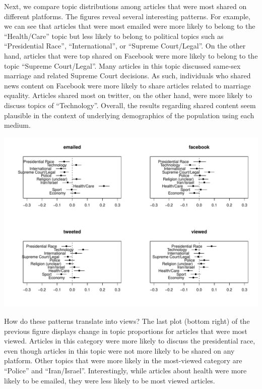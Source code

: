 \documentclass[12pt]{article}\usepackage[]{graphicx}\usepackage[]{color}
\makeatletter
\def\maxwidth{ %
  \ifdim\Gin@nat@width>\linewidth
    \linewidth
  \else
    \Gin@nat@width
  \fi
}
\newenvironment{knitrout}{}{} %
\makeatother
\begin{document}
Next, we compare topic distributions among articles that were most shared on different platforms. The figures reveal several interesting patterns. For example, we can see that articles that were most emailed were more likely to belong to the ``Health/Care'' topic but less likely to belong to political topics such as ``Presidential Race'', ``International'', or ``Supreme Court/Legal''. On the other hand, articles that were top shared on Facebook were more likely to belong to the topic ``Supreme Court/Legal''. Many articles in this topic discussed same-sex marriage and related Supreme Court decisions. As such, individuals who shared news content on Facebook were more likely to share articles related to marriage equality. Articles shared most on twitter, on the other hand, were more likely to discuss topics of ``Technology''. Overall, the results regarding shared content seem plausible in the context of underlying demographics of the population using each medium.

\begin{knitrout}
\color{fgcolor}
\includegraphics[width=\maxwidth]{figure/unnamed-chunk-8-1} 

\end{knitrout}

How do these patterns translate into views? The last plot (bottom right) of the previous figure displays change in topic proportions for articles that were most viewed. Articles in this category were more likely to discuss the presidential race, even though articles in this topic were not more likely to be shared on any platform. Other topics that were more likely in the most-viewed category are ``Police'' and ``Iran/Israel''. Interestingly, while articles about health were more likely to be emailed, they were less likely to be most viewed articles.
\end{document}

